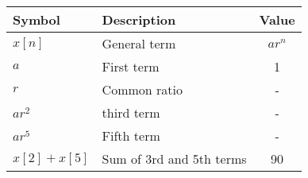 \begin{tabular}{|l|l|c|}
\hline
\textbf{Symbol} & \textbf{Description} & \textbf{Value} \\
\hline
$x[n]$ & General term & \(ar^n\) \\
\hline
$a$ & First term & 1 \\
\hline
$r$ & Common ratio & - \\
\hline
$ar^2$ & third term & - \\
\hline
$ar^5$ & Fifth term & - \\
\hline
\(x[2] + x[5]\) & Sum of 3rd and 5th terms & 90 \\
\hline
\end{tabular}

